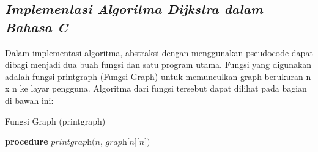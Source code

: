 \documentclass[conference]{IEEEtran}
\begin{document}
\subsection{\textit{Implementasi Algoritma Dijkstra dalam Bahasa C}}
Dalam implementasi algoritma, abstraksi dengan menggunakan
pseudocode dapat dibagi menjadi dua buah fungsi dan
satu program utama. Fungsi yang digunakan adalah fungsi
printgraph (Fungsi Graph) untuk memunculkan graph berukuran
n x n ke layar pengguna. Algoritma dari fungsi tersebut
dapat dilihat pada bagian di bawah ini:

\begin{algorithm}[hbt!]
\caption{Fungsi Graph (printgraph)}\label{alg:two}
\textbf{procedure} $\textit{printgraph(n, graph[n][n])}$ \\
\end{algorithm}
\end{document}
